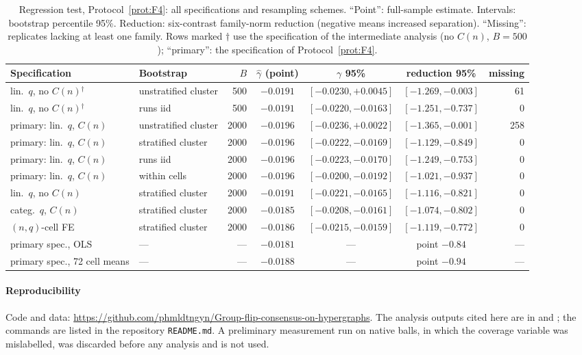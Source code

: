 \documentclass[pdflatex,sn-mathphys-num]{sn-jnl}
\theoremstyle{thmstyleone}%
\theoremstyle{thmstylethree}%
\theoremstyle{thmstyletwo}%
\begin{document}
\begin{table}[t]
\caption{Regression test, Protocol~\ref{prot:F4}: all specifications and
resampling schemes. ``Point'': full-sample estimate. Intervals: bootstrap
percentile 95\%. Reduction: six-contrast family-norm reduction (negative
means increased separation). ``Missing'': replicates lacking at least one
family. Rows marked $\dagger$ use the specification of the intermediate
analysis (no $C(n)$, $B=500$); ``primary'': the specification of
Protocol~\ref{prot:F4}.}
\label{tab:smreg}
\centering
\tiny\setlength{\tabcolsep}{1.5pt}
\begin{tabular*}{\textwidth}{@{\extracolsep\fill}llrcccr}
\toprule
Specification & Bootstrap & $B$ & $\hat\gamma$ (point) & $\gamma$ 95\% & reduction 95\% & missing\\
\midrule
lin.\ $q$, no $C(n)$$^\dagger$ & unstratified cluster & 500 & $-0.0191$ & $[-0.0230,+0.0045]$ & $[-1.269,-0.003]$ & 61\\
lin.\ $q$, no $C(n)$$^\dagger$ & runs iid & 500 & $-0.0191$ & $[-0.0220,-0.0163]$ & $[-1.251,-0.737]$ & 0\\
primary: lin.\ $q$, $C(n)$ & unstratified cluster & 2000 & $-0.0196$ & $[-0.0236,+0.0022]$ & $[-1.365,-0.001]$ & 258\\
primary: lin.\ $q$, $C(n)$ & stratified cluster & 2000 & $-0.0196$ & $[-0.0222,-0.0169]$ & $[-1.129,-0.849]$ & 0\\
primary: lin.\ $q$, $C(n)$ & runs iid & 2000 & $-0.0196$ & $[-0.0223,-0.0170]$ & $[-1.249,-0.753]$ & 0\\
primary: lin.\ $q$, $C(n)$ & within cells & 2000 & $-0.0196$ & $[-0.0200,-0.0192]$ & $[-1.021,-0.937]$ & 0\\
lin.\ $q$, no $C(n)$ & stratified cluster & 2000 & $-0.0191$ & $[-0.0221,-0.0165]$ & $[-1.116,-0.821]$ & 0\\
categ.\ $q$, $C(n)$ & stratified cluster & 2000 & $-0.0185$ & $[-0.0208,-0.0161]$ & $[-1.074,-0.802]$ & 0\\
$(n,q)$-cell FE & stratified cluster & 2000 & $-0.0186$ & $[-0.0215,-0.0159]$ & $[-1.119,-0.772]$ & 0\\
primary spec., OLS & --- & --- & $-0.0181$ & --- & point $-0.84$ & ---\\
primary spec., 72 cell means & --- & --- & $-0.0188$ & --- & point $-0.94$ & ---\\
\bottomrule
\end{tabular*}
\end{table}

\paragraph{Reproducibility}
Code and data:
\url{https://github.com/phmldtngyn/Group-flip-consensus-on-hypergraphs}.
The analysis outputs cited here are in 
and ; the commands are listed in the
repository \texttt{README.md}. A preliminary measurement run on native
balls, in which the coverage variable was mislabelled, was discarded
before any analysis and is not used.
\end{document}
